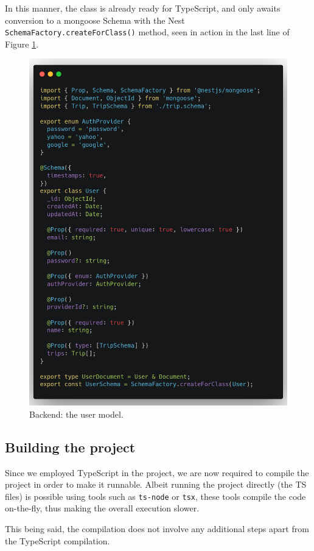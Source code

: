 In this manner, the class is already ready for TypeScript, and only awaits conversion to a mongoose Schema with the Nest \verb|SchemaFactory.createForClass()| method, seen in action in the last line of Figure \ref{FigBeUserModel}.

\begin{figure}[htbp]
    \centering
    \includegraphics[width=.8\textwidth]{./figures/code/be_user-model.png}
    \caption{Backend: the user model.}
    \label{FigBeUserModel}
\end{figure}

\subsection{Building the project}

Since we employed TypeScript in the project, we are now required to compile the project in order to make it runnable. Albeit running the project directly (the TS files) is possible using tools such as \verb|ts-node| or \verb|tsx|, these tools compile the code on-the-fly, thus making the overall execution slower.

This being said, the compilation does not involve any additional steps apart from the TypeScript compilation.


